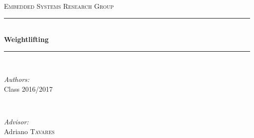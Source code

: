 \documentclass[12pt]{article}
\begin{document}
\begin{titlepage}
\newcommand{\HRule}{\rule{\linewidth}{0.5mm}} %
\center %


\textsc{\large Embedded Systems Research Group}\\[0.5cm] %


\HRule \\[1.2cm]
{ \Huge \bfseries 
Weightlifting}\\[1.0cm] %
\HRule \\[3.0cm]
 
\begin{minipage}{0.4\textwidth}
\begin{flushleft} \large
\emph{Authors:}\\
Class 2016/2017   \\
\end{flushleft}
\end{minipage}
~
\begin{minipage}{0.4\textwidth}
\begin{flushright} \large
 \emph{Advisor:} \\
Adriano \textsc{Tavares} \\ %
\end{flushright}
\end{minipage}\\[2cm]


\end{titlepage}
\end{document}
